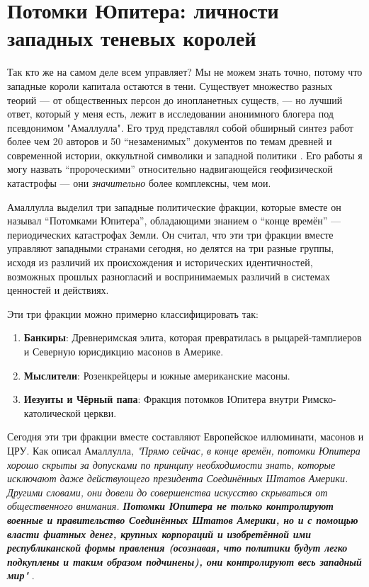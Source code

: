 \documentclass[10pt,twocolumn,letterpaper]{article}
\begin{document}
\section{Потомки Юпитера: личности западных теневых королей}

Так кто же на самом деле всем управляет? Мы не можем знать точно, потому что западные короли капитала остаются в тени. Существует множество разных теорий — от общественных персон до инопланетных существ, — но лучший ответ, который у меня есть, лежит в исследовании анонимного блогера под псевдонимом "Амаллулла". Его труд представлял собой обширный синтез работ более чем 20 авторов и 50 “незаменимых” документов по темам древней и современной истории, оккультной символики и западной политики \cite{33,34}. Его работы я могу назвать “пророческими” относительно надвигающейся геофизической катастрофы — они \textit{значительно} более комплексны, чем мои.

Амаллулла выделил три западные политические фракции, которые вместе он называл “Потомками Юпитера”, обладающими знанием о “конце времён” — периодических катастрофах Земли. Он считал, что эти три фракции вместе управляют западными странами сегодня, но делятся на три разные группы, исходя из различий их происхождения и исторических идентичностей, возможных прошлых разногласий и воспринимаемых различий в системах ценностей и действиях.

Эти три фракции можно примерно классифицировать так:

\begin{flushleft}
\begin{enumerate}
    \item \textbf{Банкиры}: Древнеримская элита, которая превратилась в рыцарей-тамплиеров и Северную юрисдикцию масонов в Америке.
    \item \textbf{Мыслители}: Розенкрейцеры и южные американские масоны.
    \item \textbf{Иезуиты и Чёрный папа}: Фракция потомков Юпитера внутри Римско-католической церкви.
\end{enumerate}
\end{flushleft}

Сегодня эти три фракции вместе составляют Европейское иллюминати, масонов и ЦРУ. Как описал Амаллулла, \textit{"Прямо сейчас, в конце времён, потомки Юпитера хорошо скрыты за допусками по принципу необходимости знать, которые исключают даже действующего президента Соединённых Штатов Америки. Другими словами, они довели до совершенства искусство скрываться от общественного внимания. \textbf{Потомки Юпитера не только контролируют военные и правительство Соединённых Штатов Америки, но и с помощью власти фиатных денег, крупных корпораций и изобретённой ими республиканской формы правления (осознавая, что политики будут легко подкуплены и таким образом подчинены), они контролируют весь западный мир}"} \cite{33,34}.
\end{document}
